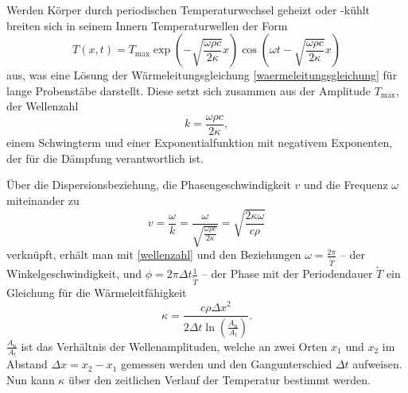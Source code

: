 Werden Körper durch periodischen Temperaturwechsel geheizt oder -kühlt breiten sich in seinem Innern Temperaturwellen der Form
\begin{equation}
	\label{temperaturwelle}
	T(x,t)= T_\mathup{max} \exp{\left(-\sqrt{\frac{\omega \rho c}{2\kappa}}x\right)} \cos{\left(\omega t - \sqrt{\frac{\omega \rho c}{2\kappa}}x\right)}
\end{equation}
aus, was eine Lösung der Wärmeleitungsgleichung \eqref{waermeleitungsgleichung} für lange Probenstäbe darstellt. Diese setzt sich zusammen aus der Amplitude $T_\text{max}$, der Wellenzahl
\begin{equation}
	\label{wellenzahl}
	k=\frac{\omega \rho c}{2\kappa} ,
\end{equation}
einem Schwingterm und einer Exponentialfunktion mit negativem Exponenten, der für die Dämpfung verantwortlich ist.

Über die Dispersionsbeziehung, die Phasengeschwindigkeit $v$ und die Frequenz $\omega$ miteinander zu
\begin{equation}
	\label{dispersion}
	v=\frac{\omega}{k}=\frac{\omega}{\sqrt{\frac{\omega\rho c}{2\kappa}}}=\sqrt{\frac{2\kappa\omega}{c\rho}}
\end{equation}
verknüpft, erhält man mit \eqref{wellenzahl} und den Beziehungen $\omega=\frac{2\pi}{\tilde{T}}$ -- der Winkelgeschwindigkeit, und $\phi=2\pi\Delta{t}\frac{1}{\tilde{T}}$ -- der Phase mit der Periodendauer $\tilde{T}$ ein Gleichung für die Wärmeleitfähigkeit
\begin{equation}
	\label{waermeleitfaehigkeit}
	\kappa=\frac{c\rho{\Delta{x}}^2}{2\Delta{t}\ln\left({\frac{A_\text{n}}{A_\text{f}}}\right)}.
\end{equation}
$\frac{A_\text{n}}{A_\text{f}}$ ist das Verhältnis der Wellenamplituden, welche an zwei Orten $x_1$ und $x_2$ im Abstand
$\Delta{x}=x_2-x_1$ gemessen werden und den Gangunterschied $\Delta{t}$ aufweisen. Nun kann $\kappa$ über den zeitlichen Verlauf der Temperatur bestimmt werden.

